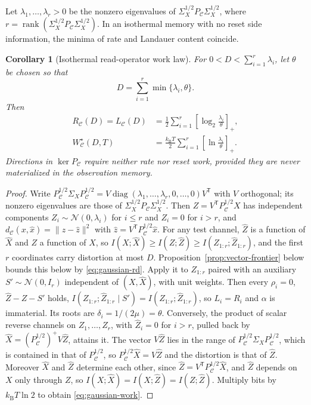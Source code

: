 \documentclass[letterpaper,onecolumn]{IEEEtran}
\newtheorem{corollary}{Corollary}
\theoremstyle{definition}
\theoremstyle{remark}
\newcommand{\cC}{\mathcal{C}}
\newcommand{\hX}{\widehat{X}}
\newcommand{\PC}{P_{\mathcal{C}}}
\newcommand{\diag}{\operatorname{diag}}
\newcommand{\rank}{\operatorname{rank}}
\newcommand{\1}{\mathbf{1}}
\newcommand{\kb}{k_{\mathrm B}}
\begin{document}
Let $\lambda_1,\ldots,\lambda_r>0$ be the nonzero eigenvalues of
$\Sigma_X^{1/2}\PC\Sigma_X^{1/2}$, where
$r=\rank(\Sigma_X^{1/2}\PC\Sigma_X^{1/2})$. In an isothermal memory with no
reset side information, the minima of rate and Landauer content coincide.

\begin{corollary}[Isothermal read-operator work law]\label{cor:gauss}
For $0<D<\sum_{i=1}^{r}\lambda_i$, let $\theta$ be chosen so that
\begin{equation}
 D=\sum_{i=1}^{r}\min\{\lambda_i,\theta\}.
 \label{eq:water-level}
\end{equation}
Then
\begin{align}
 R_{\cC}(D)=L_{\cC}(D)
 &=\frac12\sum_{i=1}^{r}
 \left[\log_2\frac{\lambda_i}{\theta}\right]_+,
 \label{eq:gaussian-rd}\\
 W_{\cC}^{\star}(D,T)
 &=\frac{\kb T}{2}\sum_{i=1}^{r}
 \left[\ln\frac{\lambda_i}{\theta}\right]_+.
 \label{eq:gaussian-work}
\end{align}
Directions in $\ker\PC$ require neither rate nor reset work, provided they are
never materialized in the observation memory.
\end{corollary}

\begin{proof}
Write $\PC^{1/2}\Sigma_X\PC^{1/2}=V\diag(\lambda_1,\ldots,\lambda_r,0,\ldots,0)V^{\mathsf T}$
with $V$ orthogonal; its nonzero eigenvalues are those of
$\Sigma_X^{1/2}\PC\Sigma_X^{1/2}$. Then $Z=V^{\mathsf T}\PC^{1/2}X$ has
independent components $Z_i\sim\mathcal N(0,\lambda_i)$ for $i\le r$ and
$Z_i=0$ for $i>r$, and
$d_{\cC}(x,\hat x)=\lVert z-\hat z\rVert^2$ with
$\hat z=V^{\mathsf T}\PC^{1/2}\hat x$. For any test channel, $\hat Z$ is a
function of $\hX$ and $Z$ a function of $X$, so
$I(X;\hX)\ge I(Z;\hat Z)\ge I(Z_{1:r};\hat Z_{1:r})$, and the first $r$
coordinates carry distortion at most $D$.
Proposition~\ref{prop:vector-frontier} below bounds this below by
\eqref{eq:gaussian-rd}. Apply it to $Z_{1:r}$ paired with an auxiliary
$S'\sim\mathcal N(0,I_r)$ independent of $(X,\hX)$, with unit weights. Then
every $\rho_i=0$, $\hat Z-Z-S'$ holds,
$I(Z_{1:r};\hat Z_{1:r}\mid S')=I(Z_{1:r};\hat Z_{1:r})$, so $L_i=R_i$ and
$\alpha$ is immaterial. Its
roots are $\delta_i=1/(2\mu)=\theta$. Conversely, the product of scalar
reverse channels on $Z_1,\ldots,Z_r$, with $\hat Z_i=0$ for $i>r$, pulled back
by $\hX=(\PC^{1/2})^{+}V\hat Z$, attains it. The vector $V\hat Z$ lies in the
range of $\PC^{1/2}\Sigma_X\PC^{1/2}$, which is contained in that of
$\PC^{1/2}$, so $\PC^{1/2}\hX=V\hat Z$ and the distortion is that of
$\hat Z$. Moreover $\hX$ and $\hat Z$ determine each other, since
$\hat Z=V^{\mathsf T}\PC^{1/2}\hX$, and $\hat Z$ depends on $X$ only through $Z$,
so $I(X;\hX)=I(X;\hat Z)=I(Z;\hat Z)$. Multiply bits by $\kb T\ln2$ to obtain
\eqref{eq:gaussian-work}.
\end{proof}
\end{document}
